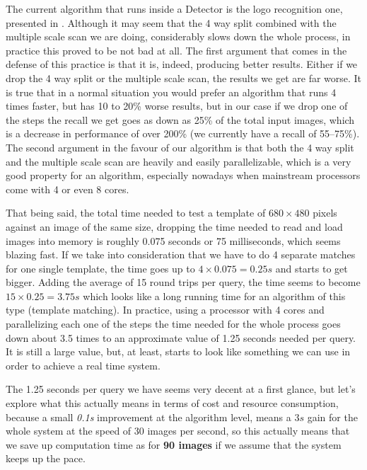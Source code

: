 The current algorithm that runs inside a Detector is the logo recognition one,
presented in . Although it may seem that
the 4 way split combined with the multiple scale scan we are doing,
considerably slows down the whole process, in practice this proved to be not
bad at all. The first argument that comes in the defense of this practice is
that it is, indeed, producing better results. Either if we drop the 4 way
split or the multiple scale scan, the results we get are far worse. It is true
that in a normal situation you would prefer an algorithm that runs 4 times
faster, but has 10 to 20\% worse results, but in our case if we drop one of
the steps the recall we get goes as down as 25\% of the total input images,
which is a decrease in performance of over 200\% (we currently have a recall
of 55--75\%). The second argument in the favour of our algorithm is that both the
4 way split and the multiple scale scan are heavily and easily parallelizable,
which is a very good property for an algorithm, especially nowadays when
mainstream processors come with 4 or even 8 cores.

That being said, the total time needed to test a template of \(680 \times 480\)
pixels against an image of the same size, dropping the time needed to read and
load images into memory is roughly 0.075 seconds or 75 milliseconds, which
seems blazing fast. If we take into consideration that we have to do 4
separate matches for one single template, the time goes up to \(4 \times 0.075
= 0.25 s\) and starts to get bigger. Adding the average of 15 round
trips per query, the time seems to become \(15 \times 0.25 = 3.75 s\)
which looks like a long running time for an algorithm of this type (template
matching). In practice, using a processor with 4 cores and parallelizing each
one of the steps the time needed for the whole process goes down about 3.5
times to an approximate value of 1.25 seconds needed per query. It is still a
large value, but, at least, starts to look like something we can use in order
to achieve a real time system.

The 1.25 seconds per query we have seems very decent at a first glance, but
let's explore what this actually means in terms of cost and resource
consumption, because a small \textit{0.1s} improvement at the algorithm level, means a
\(3s\) gain for the whole system at the speed of 30 images per second, so this
actually means that we save up computation time as for \textbf{90 images} if
we assume that the system keeps up the pace.

